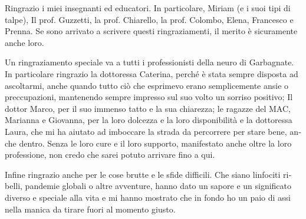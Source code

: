 \begin{otherlanguage}{italian}
Ringrazio i miei insegnanti ed educatori. In particolare, Miriam (e i suoi
tipi di talpe), Il prof. Guzzetti, la prof. Chiarello, la prof.
Colombo, Elena, Francesco e Prenna. Se sono arrivato a scrivere questi
ringraziamenti, il merito \`e sicuramente anche loro.

Un ringraziamento speciale va a tutti i professionisti della neuro di
Garbagnate. In particolare ringrazio la dottoressa Caterina, perch\'e \`e
stata sempre disposta ad ascoltarmi, anche quando tutto ci\`o che esprimevo
erano semplicemente ansie o preccupazioni, mantenendo sempre impresso sul
suo volto un sorriso positivo; Il dottor Marco, per il suo immenso tatto e
la sua chiarezza; le ragazze del MAC, Marianna e Giovanna, per la loro
dolcezza e la loro disponibilit\`a e la dottoressa Laura, che mi ha aiutato
ad imboccare la strada da percorrere per stare bene, anche dentro.  Senza
le loro cure e il loro supporto, manifestato anche oltre la loro
professione, non credo che sarei potuto arrivare fino a qui.

Infine ringrazio anche per le cose brutte e le sfide difficili. Che siano
linfociti ribelli, pandemie globali o altre avventure, hanno dato un sapore
e un significato diverso e speciale alla vita e mi hanno mostrato che in
fondo ho un paio di assi nella manica da tirare fuori al momento giusto.

\end{otherlanguage}
